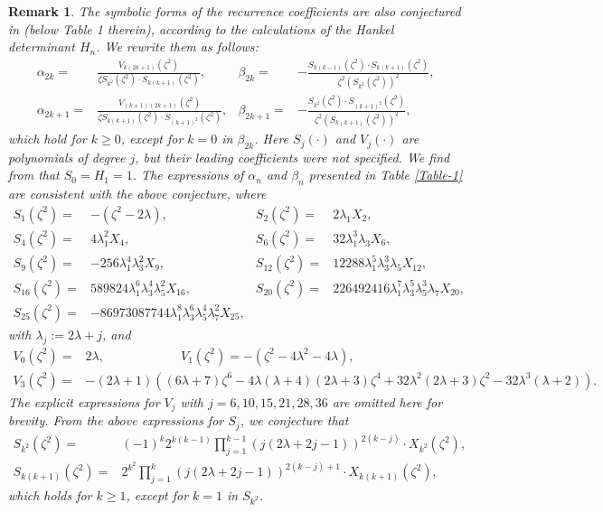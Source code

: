 \documentclass[11pt,a4paper]{article}
\newtheorem{remark}[theorem]{Remark}
\numberwithin{equation}{section}
\begin{document}
\begin{remark}
The symbolic forms of the recurrence coefficients are also conjectured in \cite{MCM} (below Table 1 therein), according to the calculations of the Hankel determinant $H_n$. We rewrite them as follows:
\begin{align*}
\alpha_{2k} =& \frac{V_{k(2k+1)}(\zeta^2)}{\zeta S_{k^2}(\zeta^2)\cdot S_{k(k+1)}(\zeta^2)}, & \beta_{2k} =& -\frac{S_{k(k-1)}(\zeta^2)\cdot S_{k(k+1)}(\zeta^2)}{\zeta^2 \left(S_{k^2}(\zeta^2)\right)^2}, \\
\alpha_{2k+1} =& \frac{V_{(k+1)(2k+1)}(\zeta^2)}{\zeta S_{k(k+1)}(\zeta^2)\cdot S_{(k+1)^2}(\zeta^2)},& \beta_{2k+1} =& -\frac{S_{k^2}(\zeta^2)\cdot S_{(k+1)^2}(\zeta^2)}{\zeta^2 \left(S_{k(k+1)}(\zeta^2)\right)^2},
\end{align*}
which hold for $k\geq0$, except for $k=0$ in $\beta_{2k}$. Here $S_j(\cdot)$ and $V_j(\cdot)$ are polynomials of degree $j$, but their leading coefficients were not specified. We find from \cite{MCM} that $S_0=H_1=1$.
The expressions of $\alpha_n$ and $\beta_n$ presented in Table \ref{Table-1} are consistent with the above conjecture, where
\begin{align*}
S_1(\zeta^2)=&-(\zeta^2-2\lambda),&S_2(\zeta^2)=&2\lambda_1X_2,\\
S_4(\zeta^2)=&4\lambda_1^2X_4,&S_6(\zeta^2)=&32 \lambda_1^3\lambda_3X_6,\\ S_9(\zeta^2)=&-256\lambda_1^4\lambda_3^2X_9,&S_{12}(\zeta^2)=&12288\lambda_1^5\lambda_3^3\lambda_5X_{12},\\
S_{16}(\zeta^2)=&589824\lambda_1^6\lambda_3^4\lambda_5^2X_{16},&S_{20}(\zeta^2)=&226492416\lambda_1^7\lambda_3^5\lambda_5^3\lambda_7X_{20},\\
S_{25}(\zeta^2)=&-86973087744\lambda_1^8\lambda_3^6\lambda_5^4\lambda_7^2X_{25},&&
\end{align*}
with $\lambda_j:=2\lambda+j$, and
\begin{align*}
V_0(\zeta^2)=&2\lambda, \qquad\qquad\qquad V_1(\zeta^2)=-(\zeta^2-4\lambda^2-4\lambda),&\\
V_3(\zeta^2)=&-(2\lambda+1)\left( (6 \lambda +7)\zeta ^6-4 \lambda (\lambda+4)(2 \lambda+3)\zeta^4+32 \lambda ^2
   (2\lambda +3)\zeta ^2-32 \lambda ^3 (\lambda +2)\right).&
\end{align*}
The explicit expressions for $V_j$ with $j=6,10,15,21,28,36$ are omitted here for brevity.
From the above expressions for $S_j$, we conjecture that
\begin{align*}
S_{k^2}(\zeta^2)=&(-1)^k 2^{k(k-1)}\prod_{j=1}^{k-1}\left(j(2\lambda+2j-1)\right)^{2(k-j)}\cdot X_{k^2}(\zeta^2),\\
S_{k(k+1)}(\zeta^2)=& 2^{k^2}\prod_{j=1}^{k}\left(j(2\lambda+2j-1)\right)^{2(k-j)+1}\cdot X_{k(k+1)}(\zeta^2),
\end{align*}
which holds for $k\geq1$, except for $k=1$ in $S_{k^2}$.
\end{remark}
\end{document}
